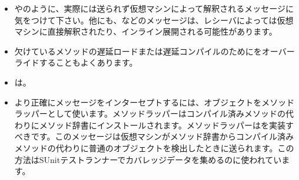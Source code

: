 \documentclass[a4paper,10pt,twoside]{book}
\begin{document}
\begin{itemize}
\item {}やのように、実際には送られず仮想マシンによって解釈されるメッセージに気をつけて下さい。他にも\ct{+}\ct{-}、などのメッセージは、レシーバによっては仮想マシンに直接解釈されたり、インライン展開される可能性があります。
\item 欠けているメソッドの遅延ロードまたは遅延コンパイルのためにをオーバーライドすることもよくあります。
\item {}は。
\item より正確にメッセージをインターセプトするには、オブジェクトをメソッドラッパーとして使います。メソッドラッパーはコンパイル済みメソッドの代わりにメソッド辞書にインストールされます。メソッドラッパーはを実装すべきです。このメッセージは仮想マシンがメソッド辞書からコンパイル済みメソッドの代わりに普通のオブジェクトを検出したときに送られます。この方法はSUnitテストランナーでカバレッジデータを集めるのに使われています。
\end{itemize}

\ifx\wholebook\relax\else
   
   
\end{document}

